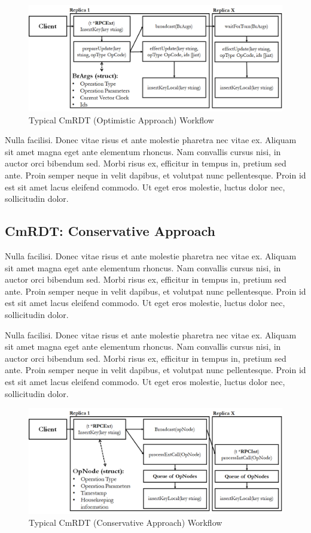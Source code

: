 \documentclass[sigconf,nonacm]{acmart}
\begin{document}
\begin{figure}[h]
  \centering
  \includegraphics[width=15.5cm]{Fig4CmRDTB}
  \caption{Typical CmRDT (Optimistic Approach) Workflow}
  \label{fig:cmrdtb}
\end{figure}

Nulla facilisi. Donec vitae risus et ante molestie pharetra nec vitae ex. Aliquam sit amet magna eget ante elementum rhoncus. Nam convallis cursus nisi, in auctor orci bibendum sed. Morbi risus ex, efficitur in tempus in, pretium sed ante. Proin semper neque in velit dapibus, et volutpat nunc pellentesque. Proin id est sit amet lacus eleifend commodo. Ut eget eros molestie, luctus dolor nec, sollicitudin dolor.

\subsection{CmRDT: Conservative Approach}

Nulla facilisi. Donec vitae risus et ante molestie pharetra nec vitae ex. Aliquam sit amet magna eget ante elementum rhoncus. Nam convallis cursus nisi, in auctor orci bibendum sed. Morbi risus ex, efficitur in tempus in, pretium sed ante. Proin semper neque in velit dapibus, et volutpat nunc pellentesque. Proin id est sit amet lacus eleifend commodo. Ut eget eros molestie, luctus dolor nec, sollicitudin dolor.

Nulla facilisi. Donec vitae risus et ante molestie pharetra nec vitae ex. Aliquam sit amet magna eget ante elementum rhoncus. Nam convallis cursus nisi, in auctor orci bibendum sed. Morbi risus ex, efficitur in tempus in, pretium sed ante. Proin semper neque in velit dapibus, et volutpat nunc pellentesque. Proin id est sit amet lacus eleifend commodo. Ut eget eros molestie, luctus dolor nec, sollicitudin dolor.

\begin{figure}[h]
  \centering
  \includegraphics[width=15.5cm]{Fig5CmRDTQ1}
  \caption{Typical CmRDT (Conservative Approach) Workflow}
  \label{fig:cmrdtq1}
\end{figure}
\end{document}
